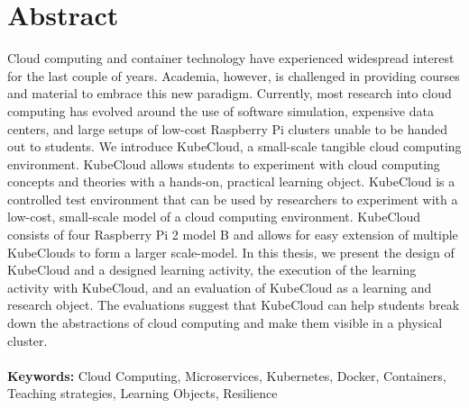 \chapter{Abstract}
Cloud computing and container technology have experienced widespread interest for the last couple of years. Academia, however, is challenged in providing courses and material to embrace this new paradigm. Currently, most research into cloud computing has evolved around the use of software simulation, expensive data centers, and large setups of low-cost Raspberry Pi clusters unable to be handed out to students. We introduce KubeCloud, a small-scale tangible cloud computing environment. KubeCloud allows students to experiment with cloud computing concepts and theories with a hands-on, practical learning object. KubeCloud is a controlled test environment that can be used by researchers to experiment with a low-cost, small-scale model of a cloud computing environment. KubeCloud consists of four Raspberry Pi 2 model B and allows for easy extension of multiple KubeClouds to form a larger scale-model. In this thesis, we present the design of KubeCloud and a designed learning activity, the execution of the learning activity with KubeCloud, and an evaluation of KubeCloud as a learning and research object.
The evaluations suggest that KubeCloud can help students break down the abstractions of cloud computing and make them visible in a physical cluster. \\ \\

\noindent
\textbf{Keywords:} Cloud Computing, Microservices, Kubernetes, Docker, Containers, Teaching strategies, Learning Objects, Resilience
